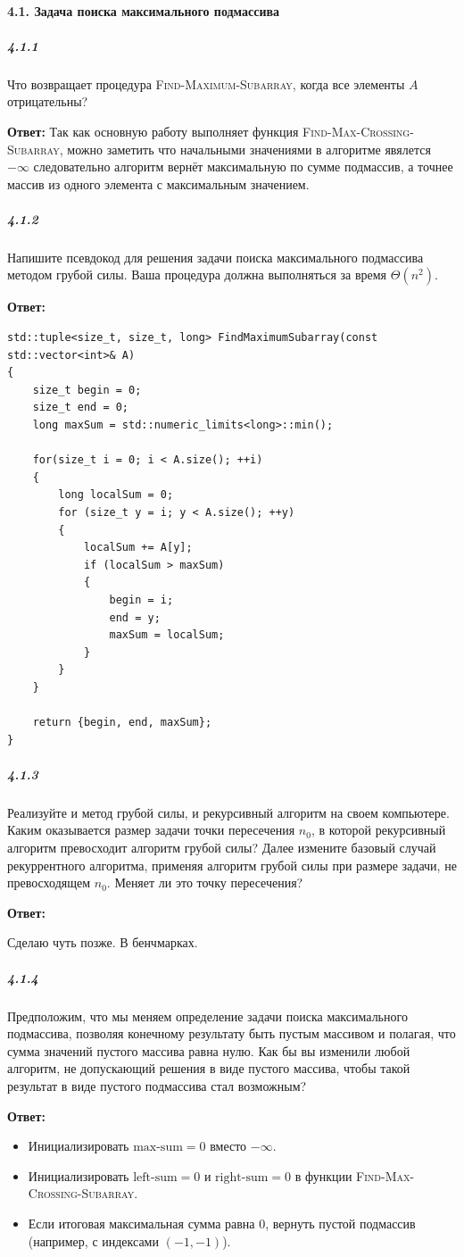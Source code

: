 \paragraph{4.1. Задача поиска максимального подмассива}

\subparagraph{4.1.1}
Что возвращает процедура \textsc{Find-Maximum-Subarray}, когда все элементы \(A\) отрицательны?

\textbf{Ответ:}
Так как основную работу выполняет функция \textsc{Find-Max-Crossing-Subarray}, можно заметить что начальными значениями в алгоритме явялется $-\infty$
следовательно алгоритм вернёт максимальную по сумме подмассив, а точнее массив из одного элемента с максимальным значением. 

\subparagraph{4.1.2}
Напишите псевдокод для решения задачи поиска максимального подмассива методом грубой силы.
Ваша процедура должна выполняться за время \(\Theta(n^2)\).

\textbf{Ответ:}

\begin{lstlisting}
std::tuple<size_t, size_t, long> FindMaximumSubarray(const std::vector<int>& A)
{
    size_t begin = 0;
    size_t end = 0;
    long maxSum = std::numeric_limits<long>::min();

    for(size_t i = 0; i < A.size(); ++i)
    {
        long localSum = 0;
        for (size_t y = i; y < A.size(); ++y)
        {
            localSum += A[y];
            if (localSum > maxSum)
            {
                begin = i;
                end = y;
                maxSum = localSum;
            }
        }
    }

    return {begin, end, maxSum};
}
\end{lstlisting}

\subparagraph{4.1.3}
Реализуйте и метод грубой силы, и рекурсивный алгоритм на своем компьютере.
Каким оказывается размер задачи точки пересечения \(n_0\),
в которой рекурсивный алгоритм превосходит алгоритм грубой силы?
Далее измените базовый случай рекуррентного алгоритма,
применяя алгоритм грубой силы при размере задачи, не превосходящем \(n_0\).
Меняет ли это точку пересечения?

\textbf{Ответ:}

Сделаю чуть позже. В бенчмарках.

\subparagraph{4.1.4}
Предположим, что мы меняем определение задачи поиска максимального подмассива,
позволяя конечному результату быть пустым массивом и полагая,
что сумма значений пустого массива равна нулю. 
Как бы вы изменили любой алгоритм, не допускающий решения в виде пустого массива, 
чтобы такой результат в виде пустого подмассива стал возможным?

\textbf{Ответ:}

\begin{itemize}
    \item Инициализировать $\text{max-sum} = 0$ вместо $-\infty$.
    \item Инициализировать $\text{left-sum} = 0$ и $\text{right-sum} = 0$ в функции 
        \textsc{Find-Max-Crossing-Subarray}.
    \item Если итоговая максимальная сумма равна $0$, вернуть пустой подмассив 
        (например, с индексами $(-1, -1)$).
\end{itemize}
